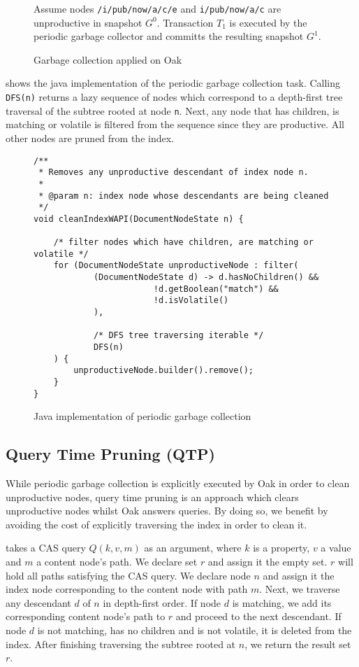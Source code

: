\documentclass[abstracton,12pt]{scrartcl}
\theoremstyle{definition}
\begin{document}
\begin{figure}
\vspace{3mm}
\caption*{
  Assume nodes \texttt{/i/pub/now/a/c/e} and \texttt{i/pub/now/a/c} are
  unproductive in snapshot $G^0$. Transaction $T_1$ is executed by the periodic
  garbage collector and committs the resulting snapshot $G^1$.
}
\caption{Garbage collection applied on Oak}
\label{fig:periodic_gc}
\end{figure}

 shows the java implementation of the periodic
garbage collection task. Calling \texttt{DFS(n)} returns a lazy sequence of nodes
which correspond to a depth-first tree traversal of the subtree rooted at node
\texttt{n}. Next, any node that has children, is matching or volatile is
filtered from the sequence since they are productive. All other nodes are pruned
from the index.

\begin{figure}
\begin{verbatim}
/**
 * Removes any unproductive descendant of index node n.
 *
 * @param n: index node whose descendants are being cleaned
 */
void cleanIndexWAPI(DocumentNodeState n) {

    /* filter nodes which have children, are matching or volatile */
    for (DocumentNodeState unproductiveNode : filter(
            (DocumentNodeState d) -> d.hasNoChildren() &&
                        !d.getBoolean("match") &&
                        !d.isVolatile()
            ),

            /* DFS tree traversing iterable */
            DFS(n)
    ) {
        unproductiveNode.builder().remove();
    }
}
\end{verbatim}
  \caption{Java implementation of periodic garbage collection}
  \label{fig:java_periodic_gc}
\end{figure}

\subsection{Query Time Pruning (QTP)}

While periodic garbage collection is explicitly executed by Oak in order to
clean unproductive nodes, query time pruning is an approach which clears
unproductive nodes whilst Oak answers queries. By doing so, we benefit by
avoiding the cost of explicitly traversing the index in order to clean it.  

 takes a CAS query $Q(k,v,m)$ as an argument, where
$k$ is a property, $v$ a value and $m$ a content node's path. We declare set $r$
and assign it the empty set. $r$ will hold all paths satisfying the CAS query.
We declare node $n$ and assign it the index node corresponding to the content
node with path $m$. Next, we traverse any descendant $d$ of $n$ in depth-first
order. If node $d$ is matching, we add its corresponding content node's path to
$r$ and proceed to the next descendant. If node $d$ is not matching, has no
children and is not volatile, it is deleted from the index. After finishing
traversing the subtree rooted at $n$, we return the result set $r$.
\end{document}
